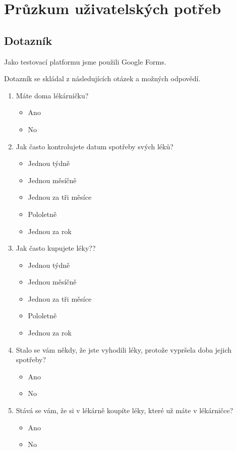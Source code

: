 \documentclass[a4paper, 11pt]{article}
\begin{document}
	\section{Průzkum uživatelských potřeb}

	\subsection{Dotazník}
Jako testovací platformu jsme použili Google Forms.

Dotazník se skládal z následujících otázek a možných odpovědí.
\begin{enumerate}
\item Máte doma lékárničku?
\begin{itemize}
\item Ano
\item No
\end{itemize}
\item Jak často kontrolujete datum spotřeby svých léků?
\begin{itemize}
    \item Jednou týdně
    \item Jednou měsíčně
    \item Jednou za tři měsíce
    \item Pololetně
    \item Jednou za rok
\end{itemize}
\item Jak často kupujete léky??
\begin{itemize}
    \item Jednou týdně
    \item Jednou měsíčně
    \item Jednou za tři měsíce
    \item Pololetně
    \item Jednou za rok
\end{itemize}
\item Stalo se vám někdy, že jste vyhodili léky, protože vypršela doba jejich spotřeby?
\begin{itemize}
\item Ano
\item No
\end{itemize}
\item Stává se vám, že si v lékárně koupíte léky, které už máte v lékárničce?
\begin{itemize}
\item Ano
\item No
\end{itemize}

\end{enumerate}
\end{document}
